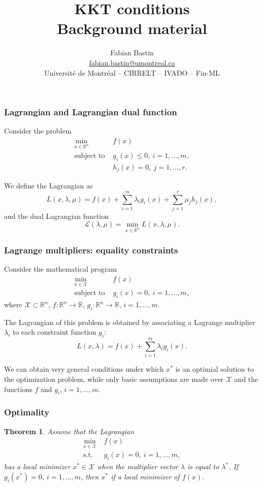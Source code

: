 \documentclass[usepdftitle=false]{beamer}
\author[Fabian Bastin]{Fabian Bastin \\ \url{fabian.bastin@umontreal.ca} \\ Université de Montréal -- CIRRELT -- IVADO -- Fin-ML}
\date{}
\title[Linear programming]{KKT conditions\\Background material}
\newtheorem{thm}{Theorem}
\def\red{\color{red}}
\def\cL{\mathcal{L}}
\def\cX{\mathcal{X}}
\def\RR{\mathbb{R}}
\begin{document}
\frame{\titlepage}


\begin{frame}
	\frametitle{Lagrangian and Lagrangian dual function}
	
Consider the problem
	\begin{align*}
		\min_{x \in \mathbb{R}^n} \ & f(x) \\
		\mbox{subject to } & g_i(x) \leq 0,\ i = 1,\ldots,m, \\
		& h_j(x) = 0,\ j = 1,\ldots,r.
	\end{align*}

We define the Lagrangian as
	$$
	L(x, \lambda, \mu) = f(x) + \sum_{i = 1}^m \lambda_i g_i(x)
	+ \sum_{j = 1}^r \mu_j h_j(x),
	$$
and the dual Lagrangian function
	$$
	\cL(\lambda, \mu) = \min_{x \in \mathbb{R}^n} L(x, \lambda, \mu).
	$$
	
\end{frame}

\begin{frame}
\frametitle{Lagrange multipliers: equality constraints}

Consider the mathematical program
\begin{align*}
\min_{x \in \cX} \ & f(x) \\
\mbox{subject to } & g_i(x) = 0,\ i = 1,\ldots,m,
\end{align*}
where $\cX \subset \RR^n$, $f: \RR^n \rightarrow \RR$, $g_i: \RR^n \rightarrow \RR$, $i = 1,\ldots,m$.

\mbox{}

The {\red Lagrangian} of this problem is obtained by associating a Lagrange multiplier  $\lambda_i$ to each constraint function $g_i$:
$$
L(x, \lambda) = f(x) + \sum_{i = 1}^{m} \lambda_i g_i(x).
$$

We can obtain very general conditions under which $x^*$ is an optimial solution to the optimization problem, while only basic assumptions are made over $\cX$ and the functions $f$ and $g_i$, $i = 1,\ldots,m$.

\end{frame}

\begin{frame}
\frametitle{Optimality}

\begin{thm}
Assume that the Lagrangian
\begin{align*}
\min_{x \in \cX} \ & f(x) \\
\mbox{s.t. } & g_i(x) = 0,\ i = 1,\ldots,m,
\end{align*}
has a local minimizer $x^* \in \cX$ when the multiplier vector $\lambda$ is equal to $\lambda^*$.
If $g_i(x^*) = 0$, $i = 1,\ldots,m$, then $x^*$ if a local minimizer of $f(x)$.
\end{thm}

\end{frame}
\end{document}
